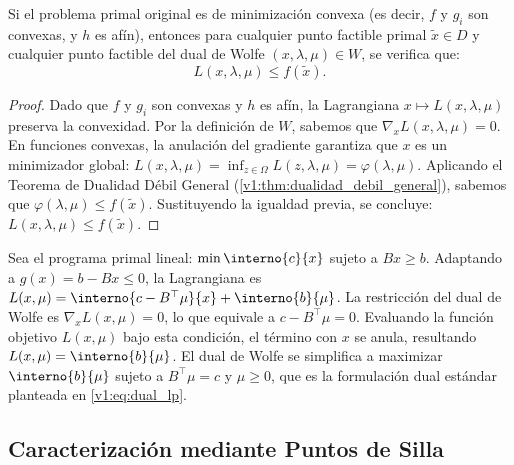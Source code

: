 \begin{theorem}\label{v1:thm:dualidad_debil_wolfe}
    Si el problema primal original es de minimización convexa (es decir, $f$ y $g_i$ son convexas, y $h$ es afín), entonces para cualquier punto factible primal $\tilde{x} \in D$ y cualquier punto factible del dual de Wolfe $(x, \lambda, \mu) \in W$, se verifica que:
    \begin{equation}
        L(x, \lambda, \mu) \le f(\tilde{x}).
    \end{equation}
\end{theorem}

\begin{proof}
    Dado que $f$ y $g_i$ son convexas y $h$ es afín, la Lagrangiana $x \mapsto L(x, \lambda, \mu)$ preserva la convexidad. Por la definición de $W$, sabemos que $\nabla_x L(x, \lambda, \mu) = 0$. En funciones convexas, la anulación del gradiente garantiza que $x$ es un minimizador global: $L(x, \lambda, \mu) = \inf_{z \in \Omega} L(z, \lambda, \mu) = \varphi(\lambda, \mu)$. Aplicando el Teorema de Dualidad Débil General (\cref{v1:thm:dualidad_debil_general}), sabemos que $\varphi(\lambda, \mu) \le f(\tilde{x})$. Sustituyendo la igualdad previa, se concluye: $L(x, \lambda, \mu) \le f(\tilde{x})$.
\end{proof}

\begin{example}\label{v1:exa:wolfe_lp}
    Sea el programa primal lineal: $\min \interno{c}{x}$ sujeto a $Bx \ge b$. Adaptando a $g(x) = b - Bx \le 0$, la Lagrangiana es $L(x, \mu) = \interno{c - B^\top \mu}{x} + \interno{b}{\mu}$. La restricción del dual de Wolfe es $\nabla_x L(x, \mu) = 0$, lo que equivale a $c - B^\top \mu = 0$. Evaluando la función objetivo $L(x, \mu)$ bajo esta condición, el término con $x$ se anula, resultando $L(x, \mu) = \interno{b}{\mu}$. El dual de Wolfe se simplifica a maximizar $\interno{b}{\mu}$ sujeto a $B^\top \mu = c$ y $\mu \ge 0$, que es la formulación dual estándar planteada en \eqref{v1:eq:dual_lp}.
\end{example}

\subsection{Caracterización mediante Puntos de Silla}

